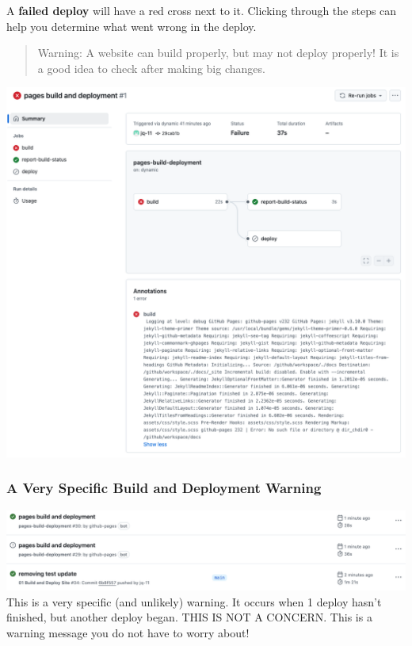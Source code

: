 \documentclass[
]{book}
\theoremstyle{definition}
\theoremstyle{definition}
\theoremstyle{definition}
\theoremstyle{definition}
\theoremstyle{remark}
\begin{document}
A \textbf{failed deploy} will have a red cross next to it. Clicking through the steps can help you determine what went wrong in the deploy.

\begin{quote}
Warning: A website can build properly, but may not deploy properly! It is a good idea to check after making big changes.
\end{quote}

\includegraphics{img/git-instruct/failed-deploy.png}\\

\subsubsection*{A Very Specific Build and Deployment Warning}\label{a-very-specific-build-and-deployment-warning}

\includegraphics{img/git-instruct/exclamation-point-deploy-warning.png}\\

This is a very specific (and unlikely) warning. It occurs when 1 deploy hasn't finished, but another deploy began. THIS IS NOT A CONCERN. This is a warning message you do not have to worry about!
\end{document}
